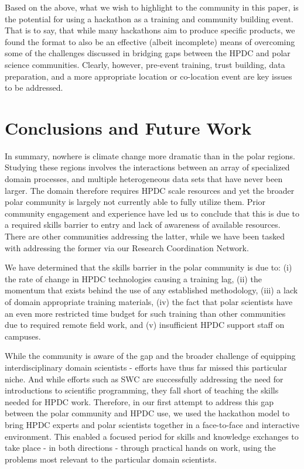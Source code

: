 \documentclass[conference]{IEEEtran}
\begin{document}
Based on the above, what we wish to highlight to the community in this paper, is the potential for using a hackathon as a training and community building event. That is to say, that while many hackathons aim to produce specific products, we found the format to also be an effective (albeit incomplete) means of overcoming some of the challenges discussed in bridging gaps between the HPDC and polar science communities. Clearly, however, pre-event training, trust building, data preparation, and a more appropriate location or co-location event are key issues to be addressed. 

\section{Conclusions and Future Work}
In summary, nowhere is climate change more dramatic than in the polar regions. Studying these regions involves the interactions between an array of specialized domain processes, and multiple heterogeneous data sets that have never been larger. The domain therefore requires HPDC scale resources and yet the broader polar community is largely not currently able to fully utilize them. Prior community engagement and experience have led us to conclude that this is due to a required skills barrier to entry and lack of awareness of available resources. There are other communities addressing the latter, while we have been tasked with addressing the former via our Research Coordination Network.

We have determined that the skills barrier in the polar community is due to: (i) the rate of change in HPDC technologies causing a training lag, (ii) the momentum that exists behind the use of any established methodology, (iii) a lack of domain appropriate training materials, (iv) the fact that polar scientists have an even more restricted time budget for such training than other communities due to required remote field work, and (v) insufficient HPDC support staff on campuses.

While the community is aware of the gap and the broader challenge of equipping interdisciplinary domain scientists - efforts have thus far missed this particular niche.  And while efforts such as SWC are successfully addressing the need for introductions to scientific programming, they fall short of teaching the skills needed for HPDC work. Therefore, in our first attempt to address this gap between the polar community and HPDC use, we used the hackathon model to bring HPDC experts and polar scientists together in a face-to-face and interactive environment.  This enabled a focused period for skills and knowledge exchanges to take place - in both directions - through practical hands on work, using the problems most relevant to the particular domain scientists.  
\end{document}

